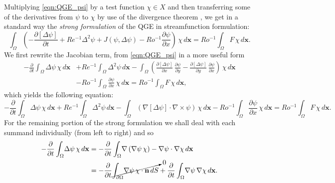 Multiplying \eqref{eqn:QGE_psi} by a test function $\chi \in X$ and then
transferring some of the derivatives from $\psi$ to $\chi$ by use of the
divergence theorem , we get in a standard way the \emph{strong formulation} of
the QGE in streamfunction formulation:
\begin{equation*}
  \int_{\Omega}\! \left(-\frac{\partial \left[ \Delta \psi \right]}{\partial t} + Re^{-1}
    \Delta^2 \psi +  J(\psi,\Delta \psi) - Ro^{-1}\frac{\partial \psi}{\partial
    x}\right)\, \chi \, d\mathbf{x} = Ro^{-1} \int_{\Omega}\! F\, \chi \,
    d\mathbf{x}.
\end{equation*}
We first rewrite the Jacobian term, from \eqref{eqn:QGE_psi} in a more useful
form
\begin{align*}
  -\frac{\partial}{\partial t} \int_{\Omega}\! \Delta \psi \, \chi \, d\mathbf{x}
    &+ Re^{-1} \int_{\Omega}\! \Delta^2 \psi \, d\mathbf{x}
    - \int_{\Omega}\! \left(\frac{\partial\left[\Delta\psi \right]}{\partial x}\, \frac{\partial
      \psi}{\partial y} -
    \frac{\partial\left[ \Delta\psi \right]}{\partial y}\,
    \frac{\partial \psi}{\partial x}\right)\, \chi\, d\mathbf{x} \\
    &- Ro^{-1} \int_{\Omega}\! \frac{\partial \psi}{\partial x}\, \chi \, d\mathbf{x}
    = Ro^{-1} \int_{\Omega}\! F\, \chi \, d\mathbf{x},
\end{align*}
which yields the following equation:
\begin{equation*}
  -\frac{\partial}{\partial t} \int_{\Omega}\! \Delta \psi \, \chi \, d\mathbf{x}
    + Re^{-1} \int_{\Omega}\! \Delta^2 \psi \, d\mathbf{x}
    - \int_{\Omega}\! \left(\nabla \left[\Delta\psi\right]\cdot \nabla \times
    \psi \right)\, \chi\,
    d\mathbf{x} -Ro^{-1} \int_{\Omega}\! \frac{\partial \psi}{\partial x}\,
    \chi \, d\mathbf{x} = Ro^{-1} \int_{\Omega}\! F\, \chi \, d\mathbf{x}.
\end{equation*}
For the remaining portion of the strong formulation we shall deal with each
summand individually (from left to right) and so
\begin{align*}
  -\frac{\partial}{\partial t} \int_{\Omega}\! \Delta \psi\, \chi \, d\mathbf{x} &=
    -\frac{\partial}{\partial t} \int_{\Omega}\! \nabla \left( \nabla \psi \, \chi \right) -
    \nabla \psi \cdot \nabla \chi \, d\mathbf{x} \\
  &= -\frac{\partial}{\partial t} \cancelto{0}{\int_{\partial \Omega}\! \nabla \psi \, \chi
    \cdot \mathbf{n} \, dS} + \frac{\partial}{\partial t} \int_{\Omega}\! \nabla
    \psi\, \nabla \chi \, d\mathbf{x}.
\end{align*}
